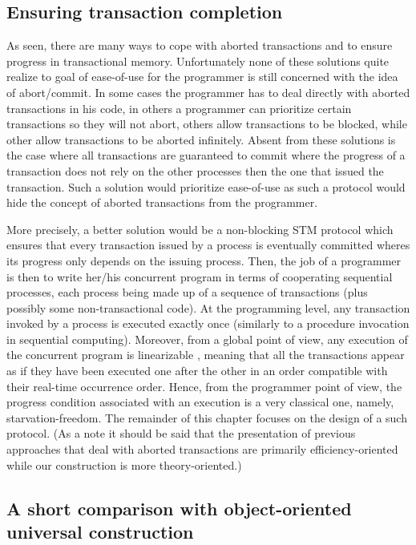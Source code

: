 \subsection{Ensuring transaction completion}
As seen, there are many ways to cope with aborted transactions
and to ensure progress in transactional memory.
Unfortunately none of these solutions quite realize to goal of ease-of-use for the
programmer is still concerned with the idea of abort/commit.
In some cases the programmer has to deal directly with aborted transactions
in his code, in others a programmer can prioritize certain transactions
so they will not abort, others allow transactions to be blocked, while
other allow transactions to be aborted infinitely.
Absent from these solutions is the case where all transactions are guaranteed to
commit where the progress of a transaction does not rely on the
other processes then the one that issued the transaction.
Such a solution would prioritize ease-of-use as such a protocol would hide
the concept of aborted transactions from the programmer.

More precisely, a better solution would be a non-blocking STM protocol which ensures that every transaction
issued by a process is eventually committed wheres its progress only depends
on the issuing process.
Then, the job of a
programmer is then to write her/his concurrent program in terms of cooperating sequential
processes, each process being made up of a sequence of transactions (plus possibly
some non-transactional code). At the programming level, any transaction invoked by
a process is executed exactly once (similarly to a procedure invocation in sequential
computing). Moreover, from a global point of view, any execution of the concurrent
program is linearizable \cite{HW90}, meaning that all the transactions appear as if they have
been executed one after the other in an order compatible with their real-time occurrence
order. Hence, from the programmer point of view, the progress condition associated
with an execution is a very classical one, namely, starvation-freedom.
The remainder of this chapter focuses on the design of a such protocol.
(As a note it should be said that the presentation of previous approaches
that deal with aborted transactions are primarily
efficiency-oriented while our construction is
more theory-oriented.)


\subsection{A short comparison with object-oriented universal construction}
\label{sec:comparison-Herlihy}

